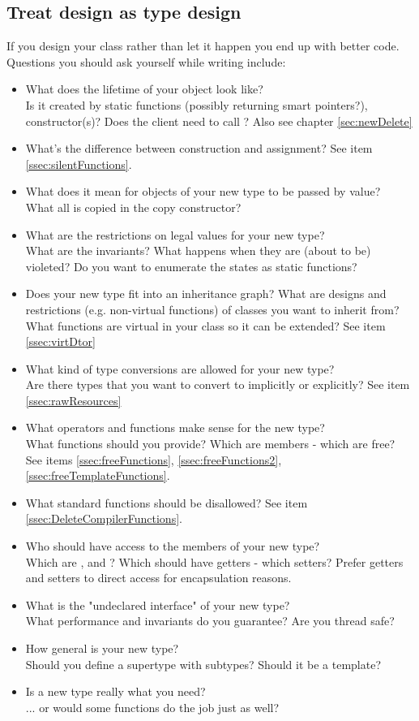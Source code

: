 \documentclass[a4paper, twocolumn]{article}
\let\oldsubsection\subsection
\newcounter{mysubsection}
\renewcommand{\subsection}{
    \stepcounter{mysubsection}
    \oldsubsection
}
\newcommand{\code}[1]{\texttt{\color{black}{#1}}}
\begin{document}
\subsection{Treat \code{class} design as type design}
If you design your class rather than let it happen you end up with better code. Questions you should ask yourself while writing include:
\begin{itemize}
	\item What does the lifetime of your object look like?\\
		Is it created by static functions \code{from...(...)} (possibly returning smart pointers?), constructor(s)? Does the client need to call \code{close}? Also see chapter \ref{sec:newDelete}
	\item What's the difference between construction and assignment? See item \ref{ssec:silentFunctions}.
	\item What does it mean for objects of your new type to be passed by value?\\
		What all is copied in the copy constructor?
	\item What are the restrictions on legal values for your new type?\\
		What are the invariants? What happens when they are (about to be) violeted? Do you want to enumerate the states as static functions?
	\item Does your new type fit into an inheritance graph?
		What are designs and restrictions (e.g. non-virtual functions) of classes you want to inherit from? What functions are virtual in your class so it can be extended? See item \ref{ssec:virtDtor}
	\item What kind of type conversions are allowed for your new type?\\
		Are there types that you want to convert to implicitly or explicitly? See item \ref{ssec:rawResources}
	\item What operators and functions make sense for the new type?\\
		What functions should you provide? Which are members - which are free? See items \ref{ssec:freeFunctions}, \ref{ssec:freeFunctions2}, \ref{ssec:freeTemplateFunctions}.
	\item What standard functions should be disallowed? See item \ref{ssec:DeleteCompilerFunctions}.
	\item Who should have access to the members of your new type?\\
		Which are \code{public}, \code{protected} and \code{private}? Which should have getters - which setters? Prefer getters and setters to direct access for encapsulation reasons.
	\item What is the "undeclared interface" of your new type?\\
		What performance and invariants do you guarantee? Are you thread safe?
	\item How general is your new type?\\
		Should you define a supertype with subtypes? Should it be a template?
	\item Is a new type really what you need?\\
		... or would some functions do the job just as well?
\end{itemize}
\end{document}
